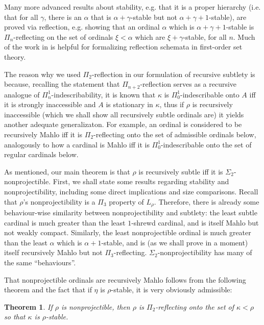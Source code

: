 \documentclass{article}
\theoremstyle{definition}
\theoremstyle{plain}
\newtheorem{theorem}[definition]{Theorem}
\theoremstyle{plain}
\theoremstyle{plain}
\theoremstyle{plain}
\theoremstyle{remark}
\theoremstyle{remark}
\theoremstyle{remark}
\theoremstyle{plain}
\theoremstyle{plain}
\theoremstyle{plain}
\begin{document}
Many more advanced results about stability, e.g. that it is a proper hierarchy (i.e. that for all $\gamma$, there is an $\alpha$ that is $\alpha+\gamma$-stable but not $\alpha+\gamma+1$-stable), are proved via reflection, e.g. showing that an ordinal $\alpha$ which is $\alpha+\gamma+1$-stable is $\Pi_n$-reflecting on the set of ordinals $\xi < \alpha$ which are $\xi+\gamma$-stable, for all $n$. Much of the work in \cite{levy} is helpful for formalizing reflection schemata in first-order set theory.

The reason why we used $\Pi_2$-reflection in our formulation of recursive subtlety is because, recalling the statement that $\Pi_{n+2}$-reflection serves as a recursive analogue of $\Pi^1_n$-indescribability, it is known that $\kappa$ is $\Pi^1_0$-indescribable onto $A$ iff it is strongly inaccessible and $A$ is stationary in $\kappa$, thus if $\rho$ is recursively inaccessible (which we shall show all recursively subtle ordinals are) it yields another adequate generalizaton. For example, an ordinal is considered to be recursively Mahlo iff it is $\Pi_2$-reflecting onto the set of admissible ordinals below, analogously to how a cardinal is Mahlo iff it is $\Pi^1_0$-indescribable onto the set of regular cardinals below.

As mentioned, our main theorem is that $\rho$ is recursively subtle iff it is $\Sigma_2$-nonprojectible. First, we shall state some results regarding stability and nonprojectibility, including some direct implications and size comparisons. Recall that $\rho$'s nonprojectibility is a $\Pi_3$ property of $L_\rho$. Therefore, there is already some behaviour-wise similarity between nonprojectibility and subtlety: the least subtle cardinal is much greater than the least $1$-shrewd cardinal, and is itself Mahlo but not weakly compact. Similarly, the least nonprojectible ordinal is much greater than the least $\alpha$ which is $\alpha+1$-stable, and is (as we shall prove in a moment) itself recursively Mahlo but not $\Pi_3$-reflecting. $\Sigma_2$-nonprojectibility has many of the same ``behaviours''.

That nonprojectible ordinals are recursively Mahlo follows from the following theorem and the fact that if $\eta$ is $\rho$-stable, it is very obviously admissible:

\begin{theorem}
\label{NonprojectiblePi2Ref}
If $\rho$ is nonprojectible, then $\rho$ is $\Pi_2$-reflecting onto the set of $\kappa < \rho$ so that $\kappa$ is $\rho$-stable.
\end{theorem}
\end{document}
